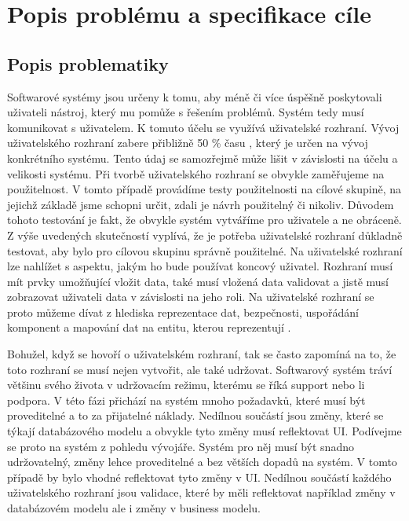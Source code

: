 \chapter{Popis problému a specifikace cíle}
\section{Popis problematiky}
Softwarové systémy jsou určeny k tomu, aby méně či více úspěšně poskytovali uživateli nástroj, který mu pomůže s řešením problémů. Systém tedy musí komunikovat s uživatelem. K tomuto účelu se využívá uživatelské rozhraní. Vývoj uživatelského rozhraní zabere přibližně 50 \% času \cite{cernyTSUID}, který je určen na vývoj konkrétního systému. Tento údaj se samozřejmě může lišit v závislosti na účelu a velikosti systému. Při tvorbě uživatelského rozhraní se obvykle zaměřujeme na použitelnost. V tomto případě provádíme testy použitelnosti na cílové skupině, na jejichž základě jsme schopni určit, zdali je návrh použitelný či nikoliv. Důvodem tohoto testování je fakt, že obvykle systém vytváříme pro uživatele a ne obráceně. Z výše uvedených skutečností vyplívá, že je potřeba uživatelské rozhraní důkladně testovat, aby bylo pro cílovou skupinu správně použitelné. Na uživatelské rozhraní lze nahlížet s aspektu, jakým ho bude používat koncový uživatel. Rozhraní musí mít prvky umožňující vložit data, také musí vložená data validovat a jistě musí zobrazovat uživateli data v závislosti na jeho roli. Na uživatelské rozhraní se proto můžeme dívat z hlediska reprezentace dat, bezpečnosti, uspořádání komponent a mapování dat na entitu, kterou reprezentují \cite{cernyTEA}. 

Bohužel, když se hovoří o uživatelském rozhraní, tak se často zapomíná na to, že toto rozhraní se musí nejen vytvořit, ale také udržovat. Softwarový systém tráví většinu svého života v udržovacím režimu, kterému se říká support nebo li podpora. V této fázi přichází na systém mnoho požadavků, které musí být proveditelné a to za přijatelné náklady. Nedílnou součástí jsou změny, které se týkají databázového modelu a obvykle tyto změny musí reflektovat UI. Podívejme se proto na systém z pohledu vývojáře. Systém pro něj musí být snadno udržovatelný, změny lehce proveditelné a bez větších dopadů na systém. V tomto případě by bylo vhodné reflektovat tyto změny v UI. Nedílnou součástí každého uživatelského rozhraní jsou validace, které by měli reflektovat například změny v databázovém modelu ale i změny v business modelu.

